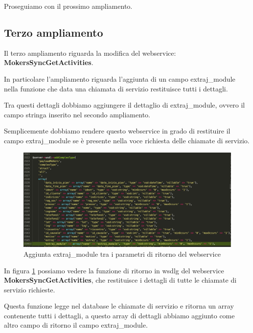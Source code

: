 	\newspace
	
	Proseguiamo con il prossimo ampliamento.


\newpage

\subsection{Terzo ampliamento}
Il terzo ampliamento riguarda la modifica del webservice:  \textbf{MokersSyncGetActivities}.


	
	In particolare l'ampliamento riguarda l'aggiunta di un campo extraj\_module nella funzione che data una chiamata di servizio restituisce tutti i dettagli.
	
	Tra questi dettagli dobbiamo aggiungere il dettaglio di extraj\_module, ovvero il campo stringa inserito nel secondo ampliamento.
	
	Semplicemente dobbiamo rendere questo webservice in grado di restituire il campo extraj\_module se è presente nella voce richiesta delle chiamate di servizio.
	

\newspace
\begin{figure}[!h] 
	\centering
	\includegraphics[scale = 0.3]{immagini/webservices/ampliamenti/3ampl__types_getCisa.png}
	\caption{Aggiunta extraj\_module tra i parametri di ritorno del webservice}
	\label{fig:5-8}
\end{figure}
\newspace

	In figura \ref{fig:5-8} possiamo vedere la funzione di ritorno in \gls{wsdlg} del webservice \textbf{MokersSyncGetActivities}, che restituisce i dettagli di tutte le chiamate di servizio richieste. 
	\newspace
	
	Questa funzione legge nel database le chiamate di servizio e ritorna un array contenente tutti i dettagli, a questo array di dettagli abbiamo aggiunto come altro campo di ritorno il campo extraj\_module.
	
	\newspace
	
